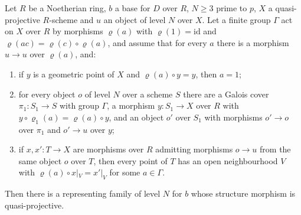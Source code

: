 \begin{proposition}\label{pf:ks1:prop-quot}
Let $R$ be a Noetherian ring, $b$ a base for $D$ over $R$, $N\ge3$ prime to $p$, $X$ a quasi-projective $R$-scheme and $u$ an object of level $N$
over $X$. Let a finite group $\Gamma$ act on $X$ over $R$ by morphisms $\varrho(a)$ with $\varrho(1)=\mathrm{id}$ and
$\varrho(ac)=\varrho(c)\circ\varrho(a)$, and assume that for every $a$ there is a morphism $u\to u$ over $\varrho(a)$, and:
\begin{enumerate}[label=(\alph*)]
\item if $y$ is a geometric point of $X$ and $\varrho(a)\circ y=y$, then $a=1$;
\item for every object $o$ of level $N$ over a scheme $S$ there are a Galois cover $\pi_1:S_1\to S$ with group $\Gamma$, a morphism $y:S_1\to X$
  over $R$ with $y\circ\varrho_1(a)=\varrho(a)\circ y$, and an object $o'$ over $S_1$ with morphisms $o'\to o$ over $\pi_1$ and $o'\to u$ over $y$;
\item if $x,x':T\to X$ are morphisms over $R$ admitting morphisms $o\to u$ from the same object $o$ over $T$, then every point of $T$ has an open
  neighbourhood $V$ with $\varrho(a)\circ x|_V=x'|_V$ for some $a\in\Gamma$.
\end{enumerate}
Then there is a representing family of level $N$ for $b$ whose structure morphism is quasi-projective.
\end{proposition}

